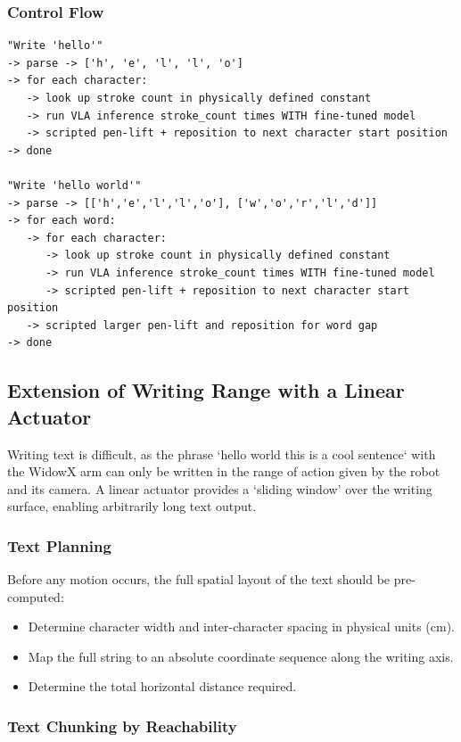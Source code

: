 \documentclass[12pt,a4paper]{article}
\begin{document}
\subsubsection*{Control Flow}

\begin{verbatim}
"Write 'hello'"
-> parse -> ['h', 'e', 'l', 'l', 'o']
-> for each character:
   -> look up stroke count in physically defined constant
   -> run VLA inference stroke_count times WITH fine-tuned model
   -> scripted pen-lift + reposition to next character start position
-> done

"Write 'hello world'"
-> parse -> [['h','e','l','l','o'], ['w','o','r','l','d']]
-> for each word:
   -> for each character:
      -> look up stroke count in physically defined constant
      -> run VLA inference stroke_count times WITH fine-tuned model
      -> scripted pen-lift + reposition to next character start position
   -> scripted larger pen-lift and reposition for word gap
-> done
\end{verbatim}

\subsection{Extension of Writing Range with a Linear Actuator}

Writing text is difficult, as the phrase `hello world this is a cool sentence` with the WidowX arm can only be written in the range of action given by the robot and its camera. A linear actuator provides a `sliding window' over the writing surface, enabling arbitrarily long text output.

\subsubsection*{Text Planning}

Before any motion occurs, the full spatial layout of the text should be pre-computed:
\begin{itemize}
  \item Determine character width and inter-character spacing in physical units (cm).
  \item Map the full string to an absolute coordinate sequence along the writing axis.
  \item Determine the total horizontal distance required.
\end{itemize}

\subsubsection*{Text Chunking by Reachability}
\end{document}
